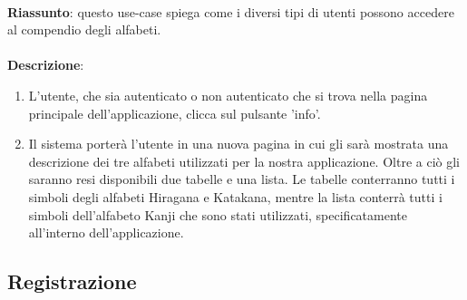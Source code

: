\\
\textbf{Riassunto}: questo use-case spiega come i diversi tipi di utenti possono accedere al compendio degli alfabeti. \\
\\
\textbf{Descrizione}:
\begin{enumerate}
    \item L'utente, che sia autenticato o non autenticato che si trova nella pagina principale dell'applicazione, clicca sul pulsante 'info'.
    \item Il sistema porterà l'utente in una nuova pagina in cui gli sarà mostrata una descrizione dei tre alfabeti utilizzati per la nostra applicazione. Oltre a ciò gli saranno resi disponibili due tabelle e una lista. Le tabelle conterranno tutti i simboli degli alfabeti Hiragana e Katakana, mentre la lista conterrà tutti i simboli dell'alfabeto Kanji che sono stati utilizzati, specificatamente all'interno dell'applicazione.
\end{enumerate}

\newpage
\subsection{Registrazione} \label{req_registrazione}

